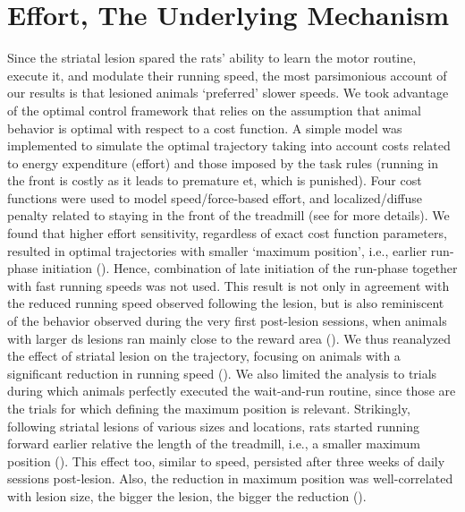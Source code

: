 \section{Effort, The Underlying Mechanism}
\label{ch:lesion:effort}

Since the striatal lesion spared the rats' ability to learn the motor routine, execute it, and modulate their running speed, the most parsimonious account of our results is that lesioned animals `preferred' slower speeds.
We took advantage of the optimal control framework that relies on the assumption that animal behavior is optimal with respect to a cost function.
A simple model was implemented to simulate the optimal trajectory taking into account costs related to energy expenditure (effort) and those imposed by the task rules (running in the front is costly as it leads to premature \gls{et}, which is punished).
Four cost functions were used to model speed/force-based effort, and localized/diffuse penalty related to staying in the front of the treadmill (see \cite{JuradoParras2020} for more details).
We found that higher effort sensitivity, regardless of exact cost function parameters, resulted in optimal trajectories with smaller `maximum position', i.e., earlier run-phase initiation ().
Hence, combination of late initiation of the run-phase together with fast running speeds was not used.
This result is not only in agreement with the reduced running speed observed following the lesion, but is also reminiscent of the behavior observed during the very first post-lesion sessions, when animals with larger \gls{ds} lesions ran mainly close to the reward area ().
We thus reanalyzed the effect of striatal lesion on the trajectory, focusing on animals with a significant reduction in running speed ().
We also limited the analysis to trials during which animals perfectly executed the wait-and-run routine, since those are the trials for which defining the maximum position is relevant.
Strikingly, following striatal lesions of various sizes and locations, rats started running forward earlier relative the length of the treadmill, i.e., a smaller maximum position ().
This effect too, similar to speed, persisted after three weeks of daily sessions post-lesion.
Also, the reduction in maximum position was well-correlated with lesion size, the bigger the lesion, the bigger the reduction ().